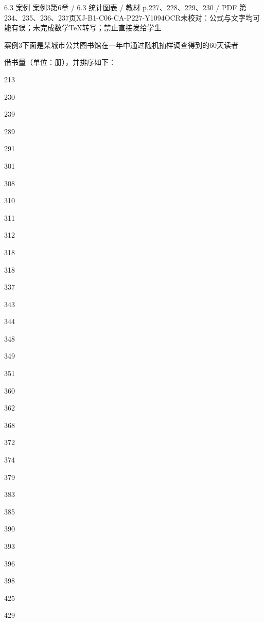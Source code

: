 \begin{bankitem}{6.3 案例 案例3}{第6章 / 6.3 统计图表 / 教材 p.227、228、229、230 / PDF 第234、235、236、237页}{XJ-B1-C06-CA-P227-Y1094}{OCR未校对：公式与文字均可能有误；未完成数学TeX转写；禁止直接发给学生}
\begin{ocrdraft}
\par
案例3下面是某城市公共图书馆在一年中通过随机抽样调查得到的60天读者
\par
借书量（单位：册），并排序如下：
\par
213
\par
230
\par
239
\par
289
\par
291
\par
301
\par
308
\par
310
\par
311
\par
312
\par
318
\par
318
\par
337
\par
343
\par
344
\par
348
\par
349
\par
351
\par
360
\par
362
\par
368
\par
372
\par
374
\par
379
\par
383
\par
385
\par
390
\par
393
\par
396
\par
398
\par
425
\par
429
\par

\end{ocrdraft}
\end{bankitem}
